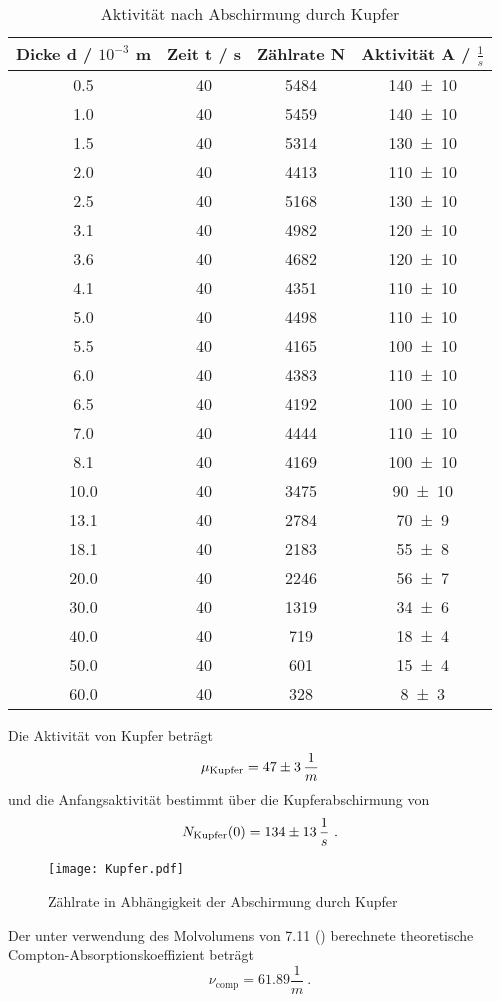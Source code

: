 \begin{table}
  \centering
  \begin{tabular}{c c c c}
    \toprule
    Dicke d / $10^{-3}$ m & Zeit t / s & Zählrate N & Aktivität A / $\frac{1}{s}$ \\
    \midrule
    0.5		&40	&5484&	\num{140 +- 10} \\
    1.0		&40	&5459&	\num{140 +- 10} \\
    1.5		&40	&5314&	\num{130 +- 10} \\
    2.0		&40	&4413&	\num{110 +- 10} \\
    2.5		&40	&5168&	\num{130 +- 10} \\
    3.1		&40	&4982&	\num{120 +- 10} \\
    3.6		&40	&4682&	\num{120 +- 10} \\
    4.1		&40	&4351&	\num{110 +- 10} \\
    5.0		&40	&4498&	\num{110 +- 10} \\
    5.5		&40	&4165&	\num{100 +- 10} \\
    6.0		&40	&4383&	\num{110 +- 10} \\
    6.5		&40	&4192&	\num{100 +- 10} \\
    7.0		&40	&4444&	\num{110 +- 10} \\
    8.1		&40	&4169&	\num{100 +- 10} \\
    10.0	&40	&3475&	\num{90 +- 10} \\
    13.1	&40 	&2784&	\num{70 +- 9} \\
    18.1	&40	&2183&	\num{55 +- 8} \\
    20.0	&40	&2246&	\num{56 +- 7} \\
    30.0	&40 	&1319&	\num{34 +- 6} \\
    40.0    	&40 	&719&	\num{18 +- 4} \\
    50.0    	&40 	&601&	\num{15 +- 4} \\
    60.0	&40 	&328&	\num{8 +- 3} \\
    \bottomrule
  \end{tabular}
  \caption{Aktivität nach Abschirmung durch Kupfer}
  \label{tab:AKupfer}
\end{table}
Die Aktivität von Kupfer beträgt
\begin{equation}
  \mu_\text{Kupfer} = \num{ 47 +- 3 } \, \frac{1}{m}
  \label{eqn:muku}
\end{equation}
und die Anfangsaktivität bestimmt über die Kupferabschirmung von
\begin{equation}
  N_\text{Kupfer}(0) = \num{134 +- 13} \, \frac{1}{s} \ .
  \label{eqn:NKu}
\end{equation}
\begin{figure}
  \centering
  \texttt{[image: Kupfer.pdf]}
  \caption{Zählrate in Abhängigkeit der Abschirmung durch Kupfer}
  \label{fig:Kupfer}
\end{figure}
Der unter verwendung des Molvolumens von 7.11 (\cite{Kupfer}) berechnete theoretische Compton-Absorptionskoeffizient beträgt
\begin{equation}
  \nu_\text{comp} = 61.89 \frac{1}{m} \ .
  \label{eqn:Kc}
\end{equation}
